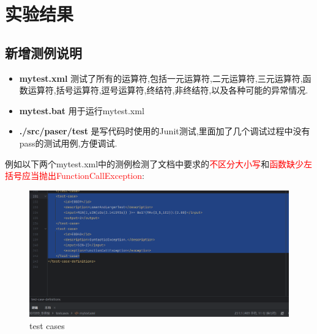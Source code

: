 \documentclass{article}
\begin{document}
\section{实验结果}
\subsection{新增测例说明}
\begin{itemize}
    \item \textbf{mytest.xml} 测试了所有的运算符,包括一元运算符,二元运算符,三元运算符,函数运算符,括号运算符,逗号运算符,终结符,非终结符,以及各种可能的异常情况.
    \item \textbf{mytest.bat} 用于运行mytest.xml
    \item \textbf{./src/paser/test} 是写代码时使用的Junit测试,里面加了几个调试过程中没有pass的测试用例,方便调试.
\end{itemize}
例如以下两个mytest.xml中的测例检测了文档中要求的\textcolor{red}{不区分大小写}和\textcolor{red}{函数缺少左括号应当抛出FunctionCallException}:
\begin{figure}[H]
    \centering
    \includegraphics[width=0.7\linewidth]{cases.png}
    \caption{test cases}
    \label{fig:cases}
\end{figure}
\newpage
\end{document}
